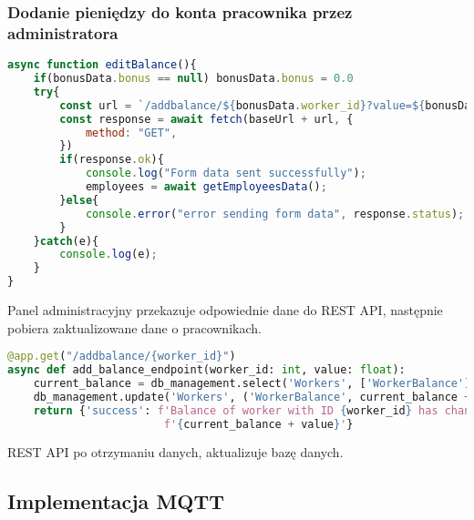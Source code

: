 \subsubsection{Dodanie pieniędzy do konta pracownika przez administratora}
\begin{lstlisting}[language={JavaScript}, caption={Panel administracyjny, Lokalizacja: \texttt{frontend/app/src/routes/employees/+page.svelte}}]
async function editBalance(){
    if(bonusData.bonus == null) bonusData.bonus = 0.0
    try{
        const url = `/addbalance/${bonusData.worker_id}?value=${bonusData.bonus}`
        const response = await fetch(baseUrl + url, {
            method: "GET",
        })
        if(response.ok){
            console.log("Form data sent successfully");
            employees = await getEmployeesData();
        }else{
            console.error("error sending form data", response.status);
        }
    }catch(e){
        console.log(e);
    }
}
\end{lstlisting}
Panel administracyjny przekazuje odpowiednie dane do REST API, następnie pobiera zaktualizowane dane o pracownikach.
\begin{lstlisting}[language={Python}, caption={REST API, Lokalizacja: \texttt{backend/server.py}}]
@app.get("/addbalance/{worker_id}")
async def add_balance_endpoint(worker_id: int, value: float):
    current_balance = db_management.select('Workers', ['WorkerBalance'], [('WorkerID', worker_id)])[0][0]
    db_management.update('Workers', ('WorkerBalance', current_balance + value), ('WorkerID', worker_id))
    return {'success': f'Balance of worker with ID {worker_id} has changed from {current_balance} to '
                        f'{current_balance + value}'}
\end{lstlisting}
REST API po otrzymaniu danych, aktualizuje bazę danych.
\subsection{Implementacja MQTT}
